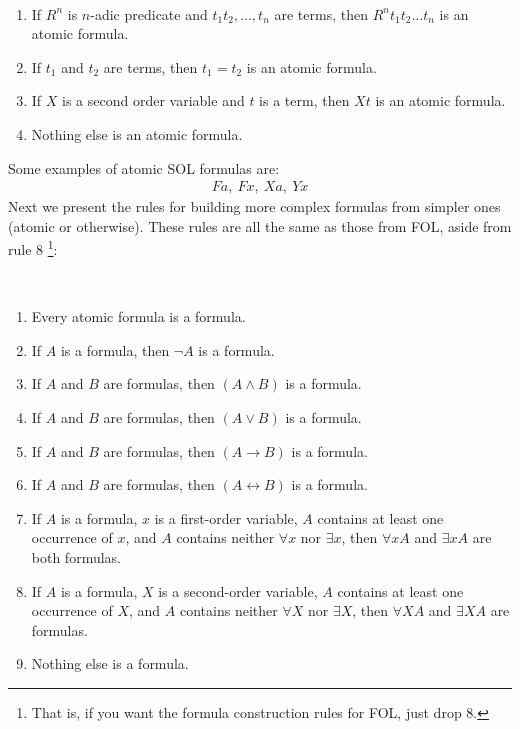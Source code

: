 \begin{definition} \hspace{0.1in} \\
    \begin{enumerate}
        \item If $R^n$ is $n$-adic predicate and $t_1 t_2 , \dots, t_n$ are terms, then $R^n t_1 t_2 \dots t_n$ is an atomic formula.
        \item If $t_1$ and $t_2$ are terms, then $t_1=t_2$ is an atomic formula.
        \item If $X$ is a second order variable and $t$ is a term, then $Xt$ is an atomic formula.
        \item Nothing else is an atomic formula.
    \end{enumerate}
\end{definition}
Some examples of atomic SOL formulas are: 
\begin{align*}
    Fa, \ Fx, \ Xa, \ Yx
\end{align*}
\newpage
Next we present the rules for building more complex formulas from simpler ones (atomic or otherwise). These rules are all the same as those from FOL, aside from rule 8 \footnote{That is, if you want the formula construction rules for FOL, just drop 8.}:
\begin{definition} \hspace{0.1in}\\
    \begin{enumerate}
        \item Every atomic formula is a formula.
        \item If \( A \) is a formula, then \( \neg A \) is a formula.
        \item If \( A \) and \( B \) are formulas, then \( (A \wedge B) \) is a formula.
        \item If \( A \) and \( B \) are formulas, then \( (A \vee B) \) is a formula.
        \item If \( A \) and \( B \) are formulas, then \( (A \rightarrow B) \) is a formula.
        \item If \( A \) and \( B \) are formulas, then \( (A \leftrightarrow B) \) is a formula.
        \item If \( A \) is a formula, \( x \) is a first-order variable, \( A \) contains at least one occurrence of \( x \), and \( A \) contains neither \( \forall x \) nor \( \exists x \), then \( \forall x A \) and \( \exists x A \) are both formulas.
        \item If \( A \) is a formula, \( X \) is a second-order variable, \( A \) contains at least one occurrence of \( X \), and \( A \) contains neither \( \forall X \) nor \( \exists X \), then \( \forall X A \) and \( \exists X A \) are formulas.
        \item Nothing else is a formula.
    \end{enumerate}    
\end{definition}
